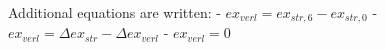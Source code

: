 Additional equations are written:
- \( ex_{verl} = ex_{str,6} - ex_{str,0} \)
- \( ex_{verl} = \Delta ex_{str} - \Delta ex_{verl} \)
- \( ex_{verl} = 0 \)